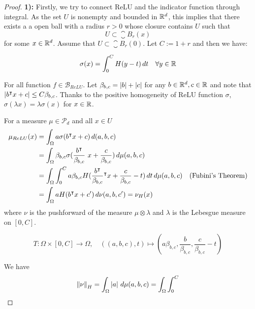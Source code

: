 \begin{proof}


\textbf{1):} 
Firstly, we try to connect ReLU and the indicator function through integral. As
the set $U$ is nonempty and bounded in $\mathbb{R}^d$, this implies that there exists a
a open ball with a radius $r > 0$ whose closure contains $U$ such that
\begin{equation}
    U \subset \closure{B_r(x)}
\end{equation}
for some $x \in \mathbb{R}^d$. Assume that $U \subset \closure{B_r(0)}$. Let $C:=1+r$
and then we have:

\begin{equation}
    \sigma(x) = \int_0^C H(y- t) \,dt \quad \forall y \in \mathbb{R} 
\end{equation}

For all function $f \in \mathcal{B}_{ReLU}$. Let $\beta_{b,c} = \left| b \right| +
\left| c \right|$ for any $b\in\mathbb{R}^d, c\in\mathbb{R}$ and note that $\left| b{}^{\intercal} x + c \right| \leq C
\beta_{b,c}$. Thanks to the positive homogeneity of ReLU function $\sigma$,
$\sigma(\lambda x) = \lambda \sigma(x)$ for $x \in \mathbb{R}$.

For a measure $\mu \in \mathcal{P}_d$ and all $x \in U$
\begin{align*}
    \mu_{ReLU}(x) 
    &= \int_{\Omega} a \sigma(b{}^{\intercal} x + c )\,d(a,b,c) \\
    &= \int_{\Omega} \beta_{b,c} \sigma(\frac{b{}^{\intercal}}{\beta_{b,c}}\ x + \frac{c}{\beta_{b,c}}) \,d\mu(a,b,c) \\
    &= \int_{\Omega} \int_0^C a \beta_{b,c} H(\frac{b{}^{\intercal}}{\beta_{b,c}}{}^{\intercal} x + \frac{c}{\beta_{b,c}} -t)\,dt\,d\mu
    (a,b,c) \quad \text{(Fubini's Theorem)}\\
    &= \int_{\Omega} a H(b{}^{\intercal} x + c') \,d\nu(a,b,c') = \nu_H(x)
\end{align*}
where $\nu$ is the pushforward of the measure $\mu \otimes \lambda$ and
$\lambda$ is the Lebesgue measure on $[0, C]$.

\begin{equation}
    T: \Omega \times [0,C] \to \Omega, \quad 
    ((a,b,c), t) \mapsto
    (a\beta_{b,c}, \frac{b}{\beta_{b,c}}, \frac{c}{\beta_{b,c}} - t )
\end{equation}

We have 
\begin{equation}
    \left\| \nu \right\|_H = \int_{\Omega} \left| a \right|\,d\mu(a,b,c) 
    = \int_{\Omega}\int_0^C 
\end{equation}


\end{proof}
